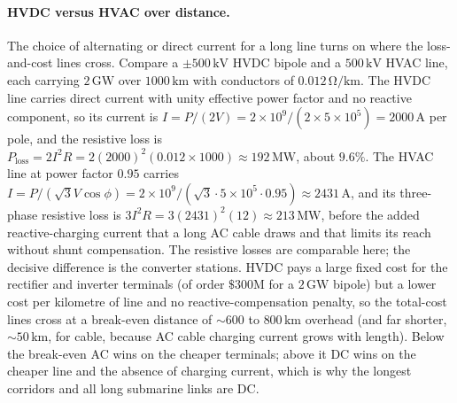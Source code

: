 \paragraph{HVDC versus HVAC over distance.} The choice of alternating or
direct current for a long line turns on where the loss-and-cost lines
cross. Compare a $\pm 500\,\si{\kilo\volt}$ HVDC bipole and a $500\,\si{
\kilo\volt}$ HVAC line, each carrying $2\,\si{\giga\watt}$ over $1000\,\si{
\kilo\meter}$ with conductors of $0.012\,\si{\ohm\per\kilo\meter}$. The
HVDC line carries direct current with unity effective power factor and no
reactive component, so its current is $I = P/(2V) = 2\times 10^9/(2\times
5\times 10^5) = 2000\,\si{\ampere}$ per pole, and the resistive loss is
$P_{\text{loss}} = 2 I^2 R = 2(2000)^2(0.012\times 1000)\approx 192\,\si{
\mega\watt}$, about $9.6\%$. The HVAC line at power factor $0.95$ carries
$I = P/(\sqrt3 V\cos\phi) = 2\times 10^9/(\sqrt3\cdot 5\times 10^5\cdot
0.95)\approx 2431\,\si{\ampere}$, and its three-phase resistive loss is $3
I^2 R = 3(2431)^2(12)\approx 213\,\si{\mega\watt}$, before the added
reactive-charging current that a long AC cable draws and that limits its
reach without shunt compensation. The resistive losses are comparable here;
the decisive difference is the converter stations. HVDC pays a large fixed
cost for the rectifier and inverter terminals (of order $\$300\text{M}$ for
a $2\,\si{\giga\watt}$ bipole) but a lower cost per kilometre of line and no
reactive-compensation penalty, so the total-cost lines cross at a break-even
distance of $\sim 600$ to $800\,\si{\kilo\meter}$ overhead (and far shorter,
$\sim 50\,\si{\kilo\meter}$, for cable, because AC cable charging current
grows with length). Below the break-even AC wins on the cheaper terminals;
above it DC wins on the cheaper line and the absence of charging current,
which is why the longest corridors and all long submarine links are DC.

